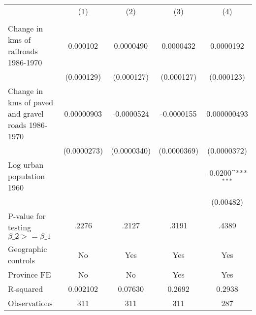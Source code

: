 {
\def\sym#1{\ifmmode^{#1}\else\(^{#1}\)\fi}
\begin{tabular}{l*{4}{c}}
\hline\hline
                &\multicolumn{1}{c}{(1)}&\multicolumn{1}{c}{(2)}&\multicolumn{1}{c}{(3)}&\multicolumn{1}{c}{(4)}\\
                &\multicolumn{1}{c}{}&\multicolumn{1}{c}{}&\multicolumn{1}{c}{}&\multicolumn{1}{c}{}\\
\hline
Change in kms of railroads 1986-1970& 0.000102         &0.0000490         &0.0000432         &0.0000192         \\
                &(0.000129)         &(0.000127)         &(0.000127)         &(0.000123)         \\
[1em]
Change in kms of paved and gravel roads 1986-1970&0.00000903         &-0.0000524         &-0.0000155         &0.000000493         \\
                &(0.0000273)         &(0.0000340)         &(0.0000369)         &(0.0000372)         \\
[1em]
Log urban population 1960&                  &                  &                  &  -0.0200\sym{***}\\
                &                  &                  &                  &(0.00482)         \\
\hline
P-value for testing $\beta\_{2} >= \beta\_{1}$&    .2276         &    .2127         &    .3191         &    .4389         \\
Geographic controls&       No         &      Yes         &      Yes         &      Yes         \\
Province FE     &       No         &       No         &      Yes         &      Yes         \\
R-squared       & 0.002102         &  0.07630         &   0.2692         &   0.2938         \\
Observations    &      311         &      311         &      311         &      287         \\
\hline\hline
\end{tabular}
}
